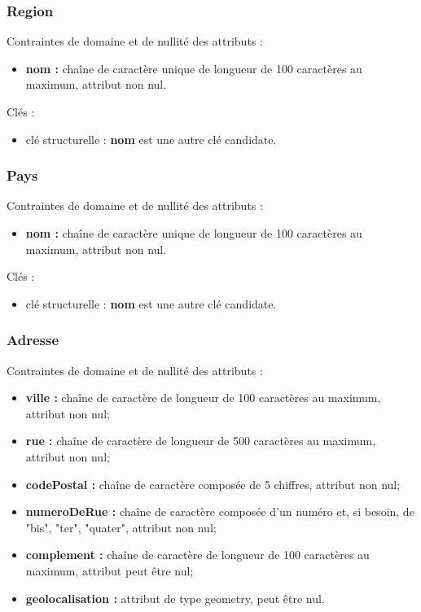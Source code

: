 \subsubsection*{Region}
Contraintes de domaine et de nullité des attributs :
\begin{itemize}
	\item \textbf{nom :} chaîne de caractère unique de longueur de 100 caractères au maximum, attribut non nul.\\
\end{itemize}

Clés : 
\begin{itemize}
\item clé structurelle :  \textbf{nom} est une autre clé candidate. \\ 
\end{itemize}



\subsubsection*{Pays}
Contraintes de domaine et de nullité des attributs :
\begin{itemize}
	\item \textbf{nom :} chaîne de caractère unique de longueur de 100 caractères au maximum, attribut non nul. \\
\end{itemize}

Clés : 
\begin{itemize}
\item clé structurelle : \textbf{nom} est une autre clé candidate. \\ 
\end{itemize}


\subsubsection*{Adresse}
Contraintes de domaine et de nullité des attributs :
\begin{itemize}
 	\item \textbf{ville :} chaîne de caractère de longueur de 100 caractères au maximum, attribut non nul;
	\item \textbf{rue :} chaîne de caractère de longueur de 500 caractères au maximum, attribut non nul;
	\item \textbf{codePostal :} chaîne de caractère composée de 5 chiffres, attribut non nul;
	\item \textbf{numeroDeRue :} chaîne de caractère composée d'un numéro et, si besoin, de "bis", "ter", "quater", attribut non nul; 
	\item \textbf{complement : } chaîne de caractère de longueur de 100 caractères au maximum, attribut peut être nul;
	\item \textbf{geolocalisation : } attribut de type geometry, peut être nul.\\
\end{itemize}

